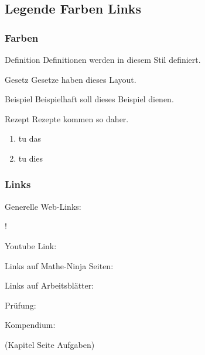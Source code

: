 %
%

\subsection{Legende Farben Links}

\subsubsection{Farben}

\begin{definition}{Definition}{}
  Definitionen werden in diesem Stil definiert.
\end{definition}

\begin{gesetz}{Gesetz}{}
  Gesetze haben dieses Layout.
\end{gesetz}

\begin{beispiel}{Beispiel}{}
  Beispielhaft soll dieses Beispiel dienen.
\end{beispiel}

\begin{rezept}{Rezept}{}
  Rezepte kommen so daher.
  \begin{enumerate}
  \item tu das
  \item tu dies
    \end{enumerate}
\end{rezept}
\newpage

\subsubsection{Links}

Generelle Web-Links:

!


Youtube Link:


Links auf Mathe-Ninja Seiten:


Links auf Arbeitsblätter:


Prüfung:


Kompendium:

(Kapitel Seite Aufgaben)


\newpage
